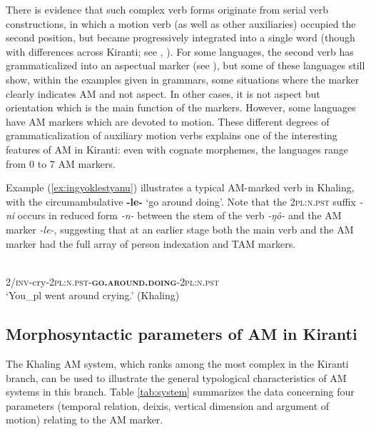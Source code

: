 \documentclass[oneside,a4paper,11pt]{article}
\newcommand{\ipa}[1]{{\phon\textit{#1}}}
\newcommand{\rouge}[1]{\textbf{#1}}
\begin{document}

There is evidence that such complex verb forms originate from serial verb constructions, in which a motion verb (as well as other auxiliaries) occupied the second position, but became progressively integrated into a single word (though with differences across Kiranti; see \citealt{bickel07chintang}, \citealt{schiering10prosodic}). For some languages, the second verb has grammaticalized into an aspectual marker (see \citealt{bickel96aspect}), but some of these languages still show, within the examples given in grammars, some situations where the marker clearly indicates AM and not aspect.  In other cases, it is not aspect but orientation which is the main function of the markers.  However, some languages have AM markers which are devoted to motion.  These different degrees of grammaticalization of auxiliary motion verbs explains one of the interesting features of AM in Kiranti: even with cognate morphemes, the languages range from 0 to 7 AM markers. 


Example (\ref{ex:ingyoklestyanu}) illustrates a typical AM-marked verb in Khaling, with the circumambulative \textbf{-le-} `go around doing'. Note that the \textsc{2pl:n.pst} suffix \ipa{-ni} occurs in reduced form \ipa{-n-} between the stem of the verb \ipa{-ŋô-} and  the AM marker \ipa{-le-}, suggesting that at an earlier stage both the main verb and the AM marker had the full array of person indexation and TAM markers.

\begin{exe}
\ex \label{ex:ingyoklestyanu}
\gll \ipa{ʔi-ŋô-n-\rouge{le}-ni} \\
2/\textsc{inv}-cry-\textsc{2pl:n.pst}-\textsc{\rouge{go.around.doing}}-\textsc{2pl:n.pst} \\
\glt `You_{pl} went around crying.'  (Khaling)
\end{exe}


\subsection{Morphosyntactic parameters of AM in Kiranti}
The Khaling AM system, which ranks among the most complex in the Kiranti branch, can be used to illustrate the general typological characteristics of AM systems in this branch. Table \ref{tab:system} summarizes the data concerning four parameters (temporal relation, deixis, vertical dimension and argument of motion) relating to the AM marker.
\end{document}
